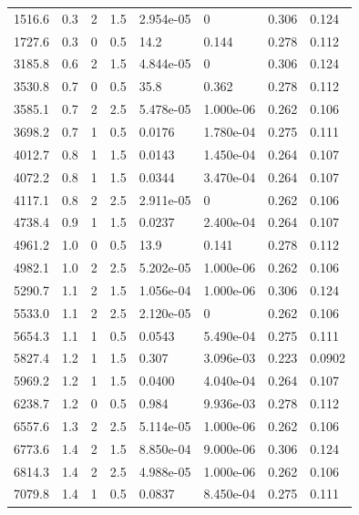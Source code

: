 \documentclass[preview]{standalone}
\begin{document}
{{\begin{tabular}{L{1.2cm}C{1.2cm} C{0.3cm}C{0.5cm} C{1.4cm}C{1.4cm} C{1.4cm}C{1.4cm}}
  1516.6  &   0.3  & 2     & 1.5 &  2.954e-05  & 0  & 0.306 &  0.124   \\ 
  1727.6  &   0.3  & 0     & 0.5 &  14.2  & 0.144  & 0.278 &  0.112   \\ 
  3185.8  &   0.6  & 2     & 1.5 &  4.844e-05  & 0  & 0.306 &  0.124   \\ 
  3530.8  &   0.7  & 0     & 0.5 &  35.8  & 0.362  & 0.278 &  0.112   \\ 
  3585.1  &   0.7  & 2     & 2.5 &  5.478e-05  & 1.000e-06  & 0.262 &  0.106   \\ 
  3698.2  &   0.7  & 1     & 0.5 &  0.0176  & 1.780e-04  & 0.275 &  0.111   \\ 
  4012.7  &   0.8  & 1     & 1.5 &  0.0143  & 1.450e-04  & 0.264 &  0.107   \\ 
  4072.2  &   0.8  & 1     & 1.5 &  0.0344  & 3.470e-04  & 0.264 &  0.107   \\ 
  4117.1  &   0.8  & 2     & 2.5 &  2.911e-05  & 0  & 0.262 &  0.106   \\ 
  4738.4  &   0.9  & 1     & 1.5 &  0.0237  & 2.400e-04  & 0.264 &  0.107   \\ 
  4961.2  &   1.0  & 0     & 0.5 &  13.9  & 0.141  & 0.278 &  0.112   \\ 
  4982.1  &   1.0  & 2     & 2.5 &  5.202e-05  & 1.000e-06  & 0.262 &  0.106   \\ 
  5290.7  &   1.1  & 2     & 1.5 &  1.056e-04  & 1.000e-06  & 0.306 &  0.124   \\ 
  5533.0  &   1.1  & 2     & 2.5 &  2.120e-05  & 0  & 0.262 &  0.106   \\ 
  5654.3  &   1.1  & 1     & 0.5 &  0.0543  & 5.490e-04  & 0.275 &  0.111   \\ 
  5827.4  &   1.2  & 1     & 1.5 &  0.307  & 3.096e-03  & 0.223 &  0.0902   \\ 
  5969.2  &   1.2  & 1     & 1.5 &  0.0400  & 4.040e-04  & 0.264 &  0.107   \\ 
  6238.7  &   1.2  & 0     & 0.5 &  0.984  & 9.936e-03  & 0.278 &  0.112   \\ 
  6557.6  &   1.3  & 2     & 2.5 &  5.114e-05  & 1.000e-06  & 0.262 &  0.106   \\ 
  6773.6  &   1.4  & 2     & 1.5 &  8.850e-04  & 9.000e-06  & 0.306 &  0.124   \\ 
  6814.3  &   1.4  & 2     & 2.5 &  4.988e-05  & 1.000e-06  & 0.262 &  0.106   \\ 
  7079.8  &   1.4  & 1     & 0.5 &  0.0837  & 8.450e-04  & 0.275 &  0.111   \\ 

\end{tabular}}}
\end{document}
